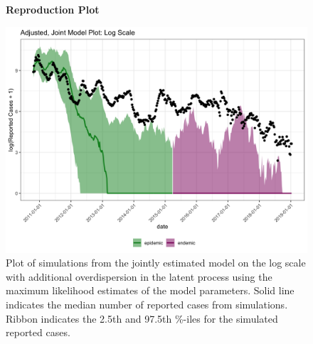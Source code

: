 \documentclass[12pt]{article}
\begin{document}
\begin{figure}[H]
  \centering
  \textbf{Reproduction Plot}\par\medskip
  \includegraphics[width=150mm]{mle_plot_joint_log.png}
  \caption{Plot of simulations from the jointly estimated model on the log scale with additional overdispersion in the latent process using the maximum likelihood estimates of the model parameters. Solid line indicates the median number of reported cases from simulations. Ribbon indicates the 2.5th and 97.5th \%-iles for the simulated reported cases.}
\end{figure}

\newpage


\end{document}
